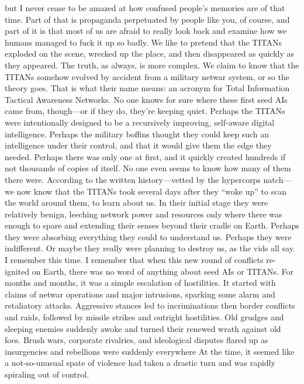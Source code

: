 but I never cease to be amazed at how confused 
people's memories are of that time. Part of that is 
propaganda perpetuated by people like you, of course, 
and part of it is that most of us are afraid to really 
look back and examine how we humans managed to 
fuck it up so badly.
We like to pretend that the TITANs exploded on 
the scene, wrecked up the place, and then disappeared 
as quickly as they appeared. The truth, as always, is 
more complex. We claim to know that the TITANs 
somehow evolved by accident from a military netwar 
system, or so the theory goes. That is what their name 
means: an acronym for Total Information Tactical 
Awareness Networks. No one knows for sure where 
these first seed AIs came from, though—or if they do, 
they're keeping quiet. Perhaps the TITANs were intentionally
designed to be a recursively improving, self-aware
digital intelligence. Perhaps the military boffins
thought they could keep such an intelligence under 
their control, and that it would give them the edge 
they needed. Perhaps there was only one at first, and 
it quickly created hundreds if not thousands of copies 
of itself. No one even seems to know how many of 
them there were.
According to the written history—vetted by the hypercorps
natch—we now know that the TITANs took
several days after they ``woke up'' to scan the world 
around them, to learn about us. In their initial stage 
they were relatively benign, leeching network power 
and resources only where there was enough to spare 
and extending their senses beyond their cradle on 
Earth. Perhaps they were absorbing everything they 
could to understand us. Perhaps they were indifferent. 
Or maybe they really were planning to destroy us, as 
the vids all say.
I remember this time. I remember that when this 
new round of conflicts re-ignited on Earth, there 
was no word of anything about seed AIs or TITANs. 
For months and months, it was a simple escalation 
of hostilities. It started with claims of netwar operations
and major intrusions, sparking some alarm and
retaliatory attacks. Aggressive stances led to incriminations
then border conflicts and raids, followed by
missile strikes and outright hostilities. Old grudges 
and sleeping enemies suddenly awoke and turned 
their renewed wrath against old foes. Brush wars, 
corporate rivalries, and ideological disputes flared up 
as insurgencies and rebellions were suddenly everywhere
At the time, it seemed like a not-so-unusual
spate of violence had taken a drastic turn and was 
rapidly spiraling out of control.

